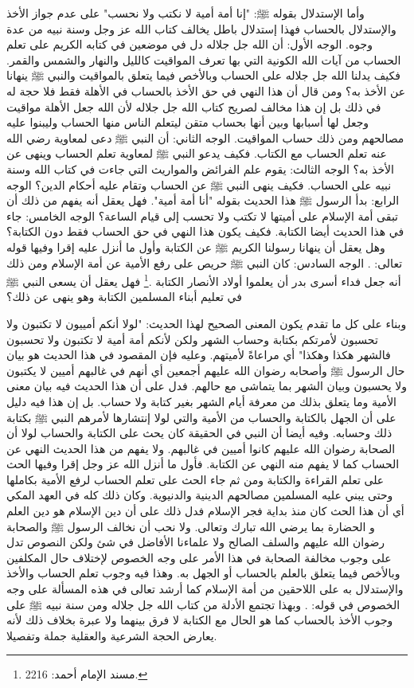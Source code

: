 وأما الإستدلال بقوله ﷺ: "إنا أمة أمية لا نكتب ولا نحسب" على عدم جواز الأخذ والإستدلال بالحساب فهذا إستدلال باطل يخالف كتاب الله عز وجل وسنة نبيه من عدة وجوه. الوجه الأول: أن الله جل جلاله دل في موضعين في كتابه الكريم على تعلم الحساب من آيات الله الكونية التي بها تعرف المواقيت كالليل والنهار والشمس والقمر. فكيف يدلنا الله جل جلاله على الحساب وبالأخص فيما يتعلق بالمواقيت والنبي ﷺ ينهانا عن الأخذ به؟ ومن قال أن هذا النهي في حق الأخذ بالحساب في الأهلة فقط فلا حجة له في ذلك بل إن هذا مخالف لصريح كتاب الله جل جلاله لأن الله جعل الأهلة مواقيت وجعل لها أسبابها وبين أنها بحساب متقن ليتعلم الناس منها الحساب وليبنوا عليه مصالحهم ومن ذلك حساب المواقيت. الوجه الثاني: أن النبي ﷺ دعى لمعاوية رضي الله عنه تعلم الحساب مع الكتاب. فكيف يدعو النبي ﷺ لمعاوية تعلم الحساب وينهى عن الأخذ به؟ الوجه الثالث: يقوم علم الفرائض والمواريث التي جاءت في كتاب الله وسنة نبيه على الحساب. فكيف ينهى النبي ﷺ عن الحساب وتقام عليه أحكام الدين؟ الوجه الرابع: بدأ الرسول ﷺ هذا الحديث بقوله "أنا أمة أمية". فهل يعقل أنه يفهم من ذلك أن تبقى أمة الإسلام على أميتها لا تكتب ولا تحسب إلى قيام الساعة؟ الوجه الخامس: جاء في هذا الحديث أيضا الكتابة. فكيف يكون هذا النهي في حق الحساب فقط دون الكتابة؟ وهل يعقل أن ينهانا رسولنا الكريم ﷺ عن الكتابة وأول ما أنزل عليه إقرا وفيها قوله تعالى: \quranayah*[96][4-5] {\footnotesize (\surahname*[96])}. الوجه السادس: كان النبي ﷺ حريص على رفع الأمية عن أمة الإسلام ومن ذلك أنه جعل فداء أسرى بدر أن يعلموا أولاد الأنصار الكتابة \href{https://shamela.ws/book/25794/1602#p1}{\faExternalLink} \cite{ahmid}.\footnote{مسند الإمام أحمد: 2216.} فهل يعقل أن يسعى النبي ﷺ  في تعليم أبناء المسلمين الكتابة وهو ينهى عن ذلك؟ 

وبناء على كل ما تقدم يكون المعنى الصحيح لهذا الحديث: "لولا أنكم أمييون لا تكتبون ولا تحسبون لأمرتكم بكتابة وحساب الشهر ولكن لأنكم أمة أمية لا تكتبون ولا تحسبون فالشهر هكذا وهكذا" أي مراعاةً لأميتهم. وعليه فإن المقصود في هذا الحديث هو بيان حال الرسول ﷺ وأصحابه رضوان الله عليهم أجمعين أي أنهم في غالبهم أميين لا يكتبون ولا يحسبون وبيان الشهر بما يتماشى مع حالهم. فدل على أن هذا الحديث فيه بيان معنى الأمية وما يتعلق بذلك من معرفة أيام الشهر بغير كتابة ولا حساب. بل إن هذا فيه دليل على أن الجهل بالكتابة والحساب من الأمية والتي لولا إنتشارها لأمرهم النبي ﷺ بكتابة ذلك وحسابه. وفيه أيضا أن النبي في الحقيقة كان يحث على الكتابة والحساب لولا أن الصحابة رضوان الله عليهم كانوا أميين في غالبهم. ولا يفهم من هذا الحديث النهي عن الحساب كما لا يفهم منه النهي عن الكتابة. فأول ما أنزل الله عز وجل إقرا وفيها الحث على تعلم القراءة والكتابة ومن ثم جاء الحث على تعلم الحساب لرفع الأمية بكاملها وحتى يبني عليه المسلمين مصالحهم الدينية والدنيوية. وكان ذلك كله في العهد المكي أي أن هذا الحث كان منذ بداية فجر الإسلام فدل ذلك على أن دين الإسلام هو دين العلم و الحضارة بما يرضي الله تبارك وتعالى. ولا نحب أن نخالف الرسول ﷺ والصحابة رضوان الله عليهم والسلف الصالح ولا علماءنا الأفاضل في شئ ولكن النصوص تدل على وجوب مخالفة الصحابة في هذا الأمر على وجه الخصوص لإختلاف حال المكلفين وبالأخص فيما يتعلق بالعلم بالحساب أو الجهل به. وهذا فيه وجوب تعلم الحساب والأخذ والإستدلال به على اللاحقين من أمة الإسلام كما أرشد تعالى في هذه المسألة على وجه الخصوص في قوله: \quranayah*[10][5] {\footnotesize (\surahname*[10])}. وبهذا تجتمع الأدلة من كتاب الله جل جلاله ومن سنة نبيه ﷺ على وجوب الأخذ بالحساب كما هو الحال مع الكتابة لا فرق بينهما ولا عبرة بخلاف ذلك لأنه يعارض الحجة الشرعية والعقلية جملة وتفصيلا.

